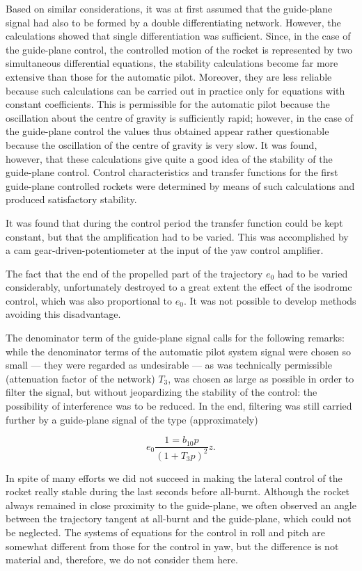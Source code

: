 \documentclass[12pt, a4paper]{article}
\begin{document}
Based on similar considerations, it was at first assumed that the guide-plane signal had also to be formed by a double differentiating network. However, the calculations showed that single differentiation was sufficient. Since, in the case of the guide-plane control, the controlled motion of the rocket is represented by two simultaneous differential equations, the stability calculations become far more extensive than those for the automatic pilot. Moreover, they are less reliable because such calculations can be carried out in practice only for equations with constant coefficients. This is permissible for the automatic pilot because the oscillation about the centre of gravity is sufficiently rapid; however, in the case of the guide-plane control the values thus obtained appear rather questionable because the oscillation of the centre of gravity is very slow. It was found, however, that these calculations give quite a good idea of the stability of the guide-plane control. Control characteristics and transfer functions for the first guide-plane controlled rockets were determined by means of such calculations and produced satisfactory stability.

It was found that during the control period the transfer function could be kept constant, but that the amplification had to be varied. This was accomplished by a cam gear-driven-potentiometer at the input of the yaw control amplifier.

The fact that the end of the propelled part of the trajectory $e_{0}$ had to be varied considerably, unfortunately destroyed to a great extent the effect of the isodromc control, which was also proportional to $e_{0}$. It was not possible to develop methods avoiding this disadvantage.

The denominator term of the guide-plane signal calls for the following remarks: while the denominator terms of the automatic pilot system signal were chosen so small — they were regarded as undesirable — as was technically permissible (attenuation factor of the network) $T_{3}$, was chosen as large as possible in order to filter the signal, but without jeopardizing the stability of the control: the possibility of interference was to be reduced. In the end, filtering was still carried further by a guide-plane signal of the type (approximately)

\begin{equation}
  e_{0}\frac{1=b_{10}p}{(1+T_{3}p)^{2}}z.
\end{equation}

In spite of many efforts we did not succeed in making the lateral control of the rocket really stable during the last seconds before all-burnt. Although the rocket always remained in close proximity to the guide-plane, we often observed an angle between the trajectory tangent at all-burnt and the guide-plane, which could not be neglected. The systems of equations for the control in roll and pitch are somewhat different from those for the control in yaw, but the difference is not material and, therefore, we do not consider them here.
\end{document}
